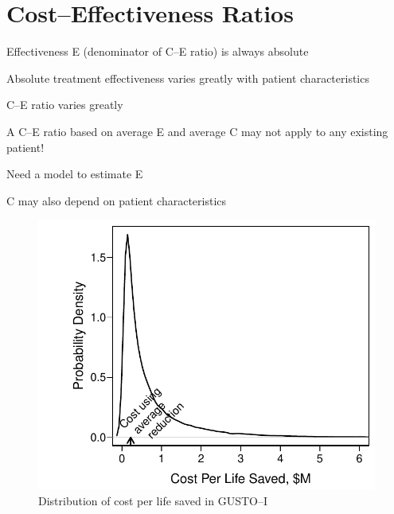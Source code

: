 \section{Cost--Effectiveness Ratios}
\bi
\item   Effectiveness E (denominator of C--E ratio) is always absolute
\item   Absolute treatment effectiveness varies greatly with patient characteristics
\item   \ra C--E ratio varies greatly
\item   A C--E ratio based on average E and average C may not apply to any existing patient!
\item   Need a model to estimate E
\item   C may also depend on patient characteristics
\begin{Schunk}
\begin{figure}[htbp]

\centerline{\includegraphics[width=\maxwidth]{ancova-gusto-histcost-1} }

\caption[Distribution of cost per life saved in GUSTO--I]{Distribution of cost per life saved in GUSTO--I}\label{fig:ancova-gusto-histcost}
\end{figure}
\end{Schunk}
\ei

